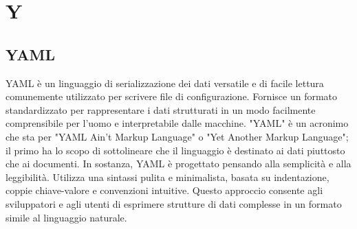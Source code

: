 \section{Y}

\vspace{2em}
\subsection*{YAML}
\par YAML è un linguaggio di serializzazione dei dati versatile e di facile lettura comunemente utilizzato per scrivere file di configurazione.
Fornisce un formato standardizzato per rappresentare i dati strutturati in un modo facilmente comprensibile per l'uomo e interpretabile dalle macchine. "YAML" è un acronimo che sta per "YAML Ain't Markup Language" o "Yet Another Markup Language"; il primo ha lo scopo di sottolineare che il linguaggio è destinato ai dati piuttosto che ai documenti.
In sostanza, YAML è progettato pensando alla semplicità e alla leggibilità. Utilizza una sintassi pulita e minimalista, basata su indentazione, coppie chiave-valore e convenzioni intuitive. Questo approccio consente agli sviluppatori e agli utenti di esprimere strutture di dati complesse in un formato simile al linguaggio naturale.
